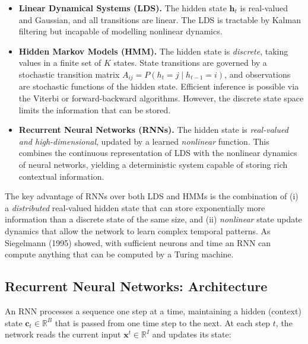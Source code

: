 \documentclass[11pt,a4paper]{article}
\begin{document}
\begin{itemize}
  \item \textbf{Linear Dynamical Systems (LDS).} The hidden state $\mathbf{h}_t$ is real-valued and Gaussian, and all transitions are linear. The LDS is tractable by Kalman filtering but incapable of modelling nonlinear dynamics.

  \item \textbf{Hidden Markov Models (HMM).} The hidden state is \emph{discrete}, taking values in a finite set of $K$ states. State transitions are governed by a stochastic transition matrix $A_{ij} = P(h_t = j \mid h_{t-1} = i)$, and observations are stochastic functions of the hidden state. Efficient inference is possible via the Viterbi or forward-backward algorithms. However, the discrete state space limits the information that can be stored.

  \item \textbf{Recurrent Neural Networks (RNNs).} The hidden state is \emph{real-valued and high-dimensional}, updated by a learned \emph{nonlinear} function. This combines the continuous representation of LDS with the nonlinear dynamics of neural networks, yielding a deterministic system capable of storing rich contextual information.
\end{itemize}

\begin{insightbox}
The key advantage of RNNs over both LDS and HMMs is the combination of (i) a \emph{distributed} real-valued hidden state that can store exponentially more information than a discrete state of the same size, and (ii) \emph{nonlinear} state update dynamics that allow the network to learn complex temporal patterns. As Siegelmann (1995) showed, with sufficient neurons and time an RNN can compute anything that can be computed by a Turing machine.
\end{insightbox}

\subsection{Recurrent Neural Networks: Architecture}
\label{sec:rnn_architecture}

An RNN processes a sequence one step at a time, maintaining a hidden (context) state $\mathbf{c}_t \in \mathbb{R}^B$ that is passed from one time step to the next. At each step $t$, the network reads the current input $\mathbf{x}^t \in \mathbb{R}^I$ and updates its state:
\end{document}
